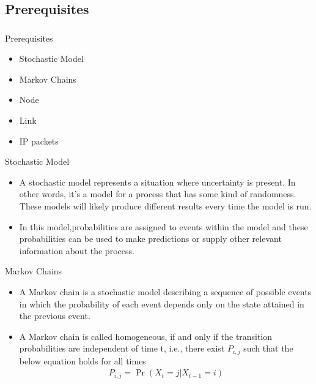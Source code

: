 \documentclass{beamer}
\providecommand{\pr}[1]{\ensuremath{\Pr\left(#1\right)}}
\begin{document}
\subsection*{Prerequisites}
\begin{frame}[fragile]
\frametitle{}
\begin{block}{Prerequisites}
\begin{itemize}
    \item Stochastic Model
    \item Markov Chains 
    \item Node
    \item Link
    \item IP packets
\end{itemize}
\end{block}
\end{frame}
\begin{frame}[fragile]
\begin{block}{Stochastic Model}
\begin{itemize}
    \item A stochastic model represents a situation where uncertainty is present. In other words, it’s a model for a process that has some kind of randomness. These models will likely produce different results every time the model is run.
    \item In this model,probabilities are assigned to events within the model and these probabilities can be used to make predictions or supply other relevant information about the process.
\end{itemize}
\end{block}
\begin{block}{Markov Chains}
\begin{itemize}
    \item A Markov chain is a stochastic model describing a sequence of possible events in which the probability of each event depends only on the state attained in the previous event.
    \item A Markov chain is called homogeneous, if and only if the transition probabilities are independent of time t, i.e., there exist $P_{i,j}$ such that the below equation holds for all times
    \begin{align}
        P_{i,j} = \pr{X_{t}=j|X_{t-1}=i} \label{Eq:1}
    \end{align}
\end{itemize}
\end{block}
\end{frame}
\end{document}
